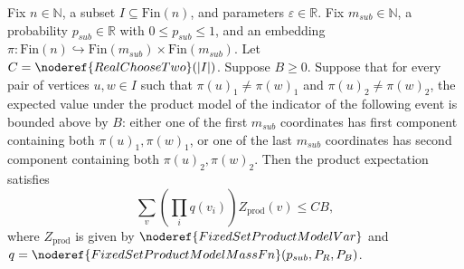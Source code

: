 \begin{helper}
Fix $n \in \mathbb{N}$, a subset $I \subseteq \mathrm{Fin}(n)$, and parameters $\varepsilon \in \mathbb{R}$.
Fix $m_{sub} \in \mathbb{N}$, a probability $p_{sub} \in \mathbb{R}$ with $0 \le p_{sub} \le 1$, and an embedding $\pi : \mathrm{Fin}(n) \hookrightarrow \mathrm{Fin}(m_{sub}) \times \mathrm{Fin}(m_{sub})$.
Let $C = \noderef{RealChooseTwo}(|I|)$.
Suppose \(B\ge0\).  Suppose that for every pair of vertices \(u,w\in I\)
such that \(\pi(u)_1\ne\pi(w)_1\) and \(\pi(u)_2\ne\pi(w)_2\), the expected
value under the product model of the indicator of the following event is
bounded above by \(B\): either one of the first \(m_{sub}\) coordinates has
first component containing both \(\pi(u)_1,\pi(w)_1\), or one of the last
\(m_{sub}\) coordinates has second component containing both
\(\pi(u)_2,\pi(w)_2\).
Then the product expectation satisfies
\[
\sum_v \left(\prod_i q(v_i)\right) Z_{\mathrm{prod}}(v) \le C B,
\]
where $Z_{\mathrm{prod}}$ is given by $\noderef{FixedSetProductModelVar}$ and $q = \noderef{FixedSetProductModelMassFn}(p_{sub}, P_R, P_B)$.
\end{helper}
